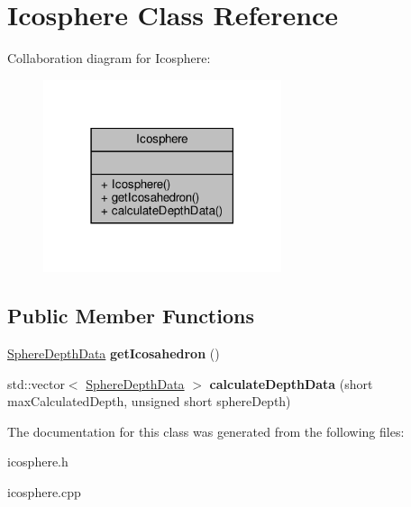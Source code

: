 \hypertarget{class_icosphere}{}\section{Icosphere Class Reference}
\label{class_icosphere}


Collaboration diagram for Icosphere\+:\nopagebreak
\begin{figure}[H]
\begin{center}
\leavevmode
\includegraphics[width=198pt]{class_icosphere__coll__graph}
\end{center}
\end{figure}
\subsection*{Public Member Functions}
\begin{DoxyCompactItemize}
\item 
\mbox{\label{class_icosphere_a504e5ebc64937cda33a2dd4a755c0ace}} 
\hyperlink{class_sphere_depth_data}{Sphere\+Depth\+Data} {\bfseries get\+Icosahedron} ()
\item 
\mbox{\label{class_icosphere_a0ab61f28cd6d528af88ce6174325a9c7}} 
std\+::vector$<$ \hyperlink{class_sphere_depth_data}{Sphere\+Depth\+Data} $>$ {\bfseries calculate\+Depth\+Data} (short max\+Calculated\+Depth, unsigned short sphere\+Depth)
\end{DoxyCompactItemize}


The documentation for this class was generated from the following files\+:\begin{DoxyCompactItemize}
\item 
icosphere.\+h\item 
icosphere.\+cpp\end{DoxyCompactItemize}
